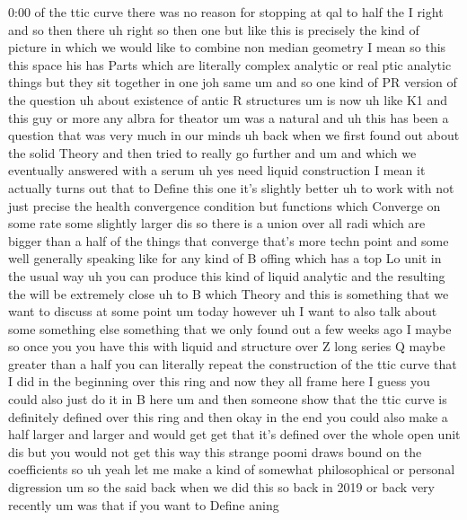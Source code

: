 \begin{unfinished}{0:00}
of  the  ttic  curve  there  was  no  reason
for  stopping  at  qal  to
half
the
I
right  and  so  then  there
uh  right  so  then  one  but  like  this  is
precisely  the  kind  of  picture  in  which
we  would  like  to  combine  non  median
geometry  I  mean  so  this  this  space  his
has  Parts  which  are  literally  complex
analytic  or  real  ptic  analytic
things  but  they  sit  together  in  one  joh
same  um  and  so  one  kind  of  PR  version  of
the
question
uh  about  existence  of  antic  R  structures
um  is  now  uh  like
K1  and  this  guy  or  more  any  albra  for
theator  um
was  a
natural  and  uh  this  has  been  a  question
that  was  very  much  in  our  minds  uh  back
when  we  first  found  out  about  the  solid
Theory  and  then  tried  to  really  go
further  and  um  and  which  we  eventually
answered  with  a
serum  uh  yes  need  liquid
construction  I  mean  it  actually  turns
out  that  to  Define  this  one  it's
slightly
better
uh  to  work
with  not  just  precise  the  health
convergence  condition  but  functions
which  Converge  on  some  rate  some
slightly  larger  dis  so  there  is  a
union  over  all  radi  which  are  bigger
than  a  half  of  the  things  that
converge
that's  more  techn
point  and  some  well  generally  speaking
like  for  any  kind  of  B  offing  which  has
a  top  Lo  unit  in  the  usual  way  uh  you
can  produce  this  kind  of  liquid
analytic  and  the  resulting  the  will  be
extremely  close  uh  to  B  which  Theory  and
this  is  something  that  we  want  to
discuss  at  some  point  um  today
however  uh  I  want  to  also  talk  about
some  something
else  something  that  we  only  found  out  a
few  weeks
ago  I
maybe  so  once  you  you  have  this  with
liquid  and  structure  over  Z  long  series
Q  maybe  greater  than  a  half  you  can
literally  repeat  the  construction  of  the
ttic  curve  that  I  did  in  the  beginning
over  this  ring  and  now  they  all  frame
here  I  guess  you  could  also  just  do  it
in  B  here  um  and  then  someone  show  that
the  ttic  curve  is  definitely  defined
over  this  ring  and  then  okay  in  the  end
you  could  also  make  a  half  larger  and
larger  and  would  get  get  that  it's
defined  over  the  whole  open  unit  dis  but
you  would  not  get  this  way
this  strange  poomi  draws  bound  on  the
coefficients  so
uh  yeah  let  me  make  a  kind  of  somewhat
philosophical  or  personal  digression  um
so  the  said  back  when  we  did  this  so
back  in  2019  or  back  very
recently
um  was  that  if  you  want  to  Define  aning

\end{unfinished}
